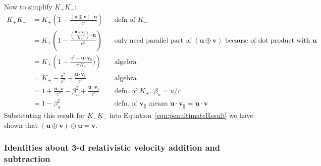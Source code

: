 \documentclass[a4paper]{article}
\theoremstyle{plain}
\theoremstyle{definition}
\newcommand{\vect}[1]{\mathbf{#1}}
\begin{document}
Now to simplify $K_{+}K_{-}$:
\begin{align*}
K_{+}K_{-}
  & = K_{+} \left( 1 - \frac{(\vect{u} \oplus \vect{v}) \cdot \vect{u}}{c^2} \right) & & \text{defn of $K_{-}$} \\
  & = K_{+} \left( 1 - \frac{ (\frac{\vect{u} + \vect{v}_{\parallel}}{K_{+}}) \cdot \vect{u}}{c^2} \right) & & \text{only need parallel part of $(\vect{u} \oplus \vect{v})$ because of dot product with $\vect{u}$} \\
  & = K_{+} \left( 1 - \frac{ u^2 + \vect{u} \cdot \vect{v}_{\parallel}}{c^2 K_{+}}) \right) & & \text{algebra} \\
  & = K_{+} - \frac{u^2}{c^2} + \frac{\vect{u} \cdot \vect{v}_{\parallel}}{c^2} & & \text{algebra} \\
  & = 1 + \frac{\vect{u} \cdot \vect{v}}{c^2} - \beta_u^2 + \frac{\vect{u} \cdot \vect{v}_{\parallel}}{c^2} & & \text{defn. of $K_{+}$, $\beta_u=u/c$} \\
  & = 1 - \beta_u^2 & & \text{defn. of $\vect{v}_{\parallel}$ means $\vect{u} \cdot \vect{v}_{\parallel} = \vect{u} \cdot \vect{v}$}
\end{align*}
Substituting this result for $K_{+}K_{-}$ into
Equation~\eqref{eqn:penultimateResult} we have shown that
$(\vect{u} \oplus \vect{v}) \ominus \vect{u} = \vect{v}$.


\subsubsection{Identities about 3-d relativistic velocity addition and subtraction}
\label{app:3drelvelocityadd-identities}
\end{document}
